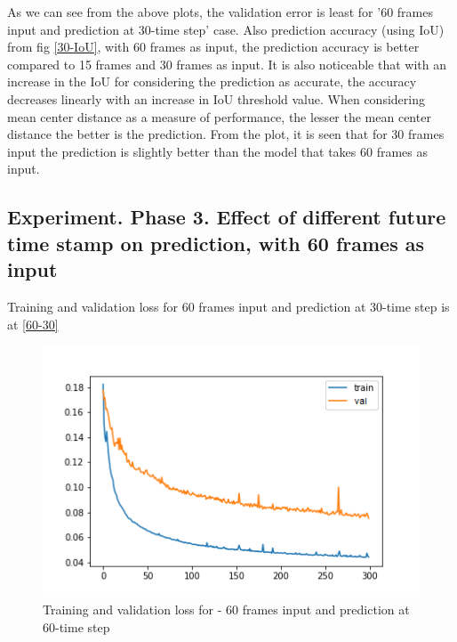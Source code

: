 



As we can see from the above plots, the validation error is least for '60 frames input and prediction at 30-time step' case. Also prediction accuracy (using IoU) from fig \ref{30-IoU}, with 60 frames as input, the prediction accuracy is better compared to 15 frames and 30 frames as input. It is also noticeable that with an increase in the IoU for considering the prediction as accurate, the accuracy decreases linearly with an increase in IoU threshold value. When considering mean center distance as a measure of performance, the lesser the mean center distance the better is the prediction. From the plot, it is seen that for 30 frames input the prediction is slightly better than the model that takes 60 frames as input.

\subsection{Experiment. Phase 3. Effect of different future time stamp on prediction, with 60 frames as input}
Training and validation loss for 60 frames input and prediction at 30-time step is at \ref{60-30}

\begin{figure}[H] 
\includegraphics[scale=0.8]{conf12_300e_60_60ffuture}
\begin{center}
\caption{Training and validation loss for - 60 frames input and prediction at 60-time step }
\label{60-60}
\end{center}
\end{figure}

